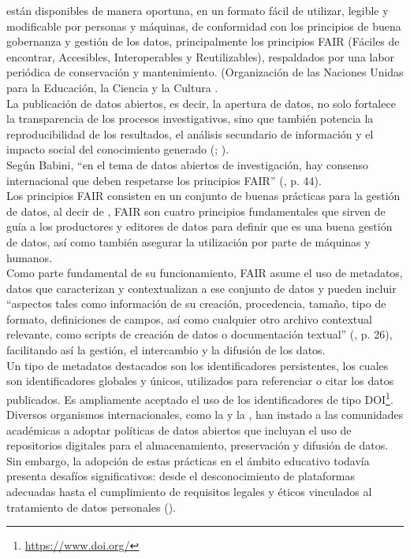 \documentclass{article}
\begin{document}
están disponibles de manera oportuna, en un formato fácil de utilizar, legible y modificable por personas y máquinas, de conformidad con los principios de buena gobernanza y gestión de los datos, principalmente los principios FAIR (Fáciles de encontrar, Accesibles, Interoperables y Reutilizables), respaldados por una labor periódica de conservación y mantenimiento. (Organización de las Naciones Unidas para la Educación, la Ciencia y la Cultura \cite[p.~10]{unesco2021}.\\

La publicación de datos abiertos, es decir, la apertura de datos, no solo fortalece la transparencia de los procesos investigativos, sino que también potencia la reproducibilidad de los resultados, el análisis secundario de información y el impacto social del conocimiento generado (\cite{ec2016}; \cite{wilkinson2016}).\\

Según Babini, “en el tema de datos abiertos de investigación, hay consenso internacional que deben respetarse los principios FAIR” (\cite{babini2020}, p. 44).\\

Los principios FAIR consisten en un conjunto de buenas prácticas para la gestión de datos, al decir de \cite{wilkinson2016}, FAIR son cuatro principios fundamentales que sirven de guía a los productores y editores de datos para definir que es una buena gestión de datos, así como también asegurar la utilización por parte de máquinas y humanos.\\

Como parte fundamental de su funcionamiento, FAIR asume el uso de metadatos, datos que caracterizan y contextualizan a ese conjunto de datos y pueden incluir “aspectos tales como información de su creación, procedencia, tamaño, tipo de formato, definiciones de campos, así como cualquier otro archivo contextual relevante, como scripts de creación de datos o documentación textual” (\cite{bezjak2019}, p. 26), facilitando así la gestión, el intercambio y la difusión de los datos.\\

Un tipo de metadatos destacados son los identificadores persistentes, los cuales son identificadores globales y únicos, utilizados para referenciar o citar los datos publicados. Es ampliamente aceptado el uso de los identificadores de tipo DOI\footnote{\url{https://www.doi.org/}}.\\

Diversos organismos internacionales, como la \cite{unesco2021} y la \cite{oecd2020}, han instado a las comunidades académicas a adoptar políticas de datos abiertos que incluyan el uso de repositorios digitales para el almacenamiento, preservación y difusión de datos. Sin embargo, la adopción de estas prácticas en el ámbito educativo todavía presenta desafíos significativos: desde el desconocimiento de plataformas adecuadas hasta el cumplimiento de requisitos legales y éticos vinculados al tratamiento de datos personales (\cite{tenopir2011}).\\
\end{document}
